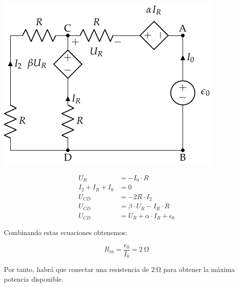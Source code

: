 \documentclass[12pt]{article}
\begin{document}
\begin{minipage}{0.5\linewidth}
  \includegraphics[width=.9\linewidth]{../figs/norton_fuenteprueba.pdf}
\end{minipage}
\begin{minipage}{0.5\linewidth}
  \begin{align*}
    U_R &= -I_0 \cdot R\\
    I_2 + I_R + I_0 &= 0\\
    U_{CD} &= -2R\cdot I_2\\
    U_{CD} &= \beta \cdot U_R - I_R \cdot R\\
    U_{CD} &= U_R + \alpha \cdot I_R + \epsilon_0
  \end{align*}
\end{minipage}

Combinando estas ecuaciones obtenemos:

\begin{equation*}
  R_{th} = \frac{\epsilon_0}{I_0} = \SI{2}{\ohm}
\end{equation*}

Por tanto, habrá que conectar una resistencia de $\SI{2}{\ohm}$ para obtener la máxima potencia disponible.
\end{document}
